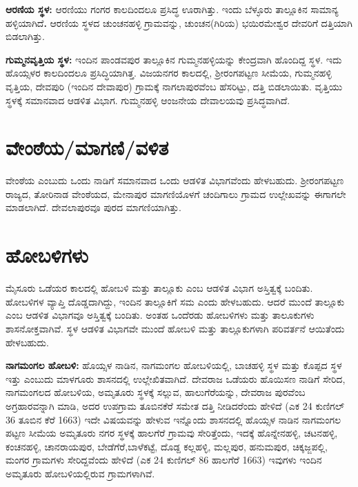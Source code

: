 \textbf{ಆರಣಿಯ ಸ್ಥಳ:} ಆರಣಿಯು ಗಂಗರ ಕಾಲದಿಂದಲೂ ಪ್ರಸಿದ್ಧ ಊರಾಗಿತ್ತು. ಇಂದು ಬೆಳ್ಳೂರು ತಾಲ್ಲೂಕಿನ ಸಾಮಾನ್ಯ ಹಳ್ಳಿಯಾಗಿದೆ\textbf{. }ಆರಣಿಯ ಸ್ಥಳದ ಚುಂಚನಹಳ್ಳಿ ಗ್ರಾಮವನ್ನು, ಚುಂಚನ(ಗಿರಿಯ) ಭಯಿರಮೇಶ್ವರ ದೇವರಿಗೆ ದತ್ತಿಯಾಗಿ ಬಿಡಲಾಗಿತ್ತು.

\textbf{ಗುಮ್ಮನವೃತ್ತಿಯ ಸ್ಥಳ:} ಇಂದಿನ ಪಾಂಡವಪುರ ತಾಲ್ಲೂಕಿನ ಗುಮ್ಮನಹಳ್ಳಿಯನ್ನು ಕೇಂದ್ರವಾಗಿ ಹೊಂದಿದ್ದ ಸ್ಥಳ. ಇದು ಹೊಯ್ಸಳರ ಕಾಲದಿಂದಲೂ ಪ್ರಸಿದ್ಧಿಯಾಗಿತ್ತ. ವಿಜಯನಗರ ಕಾಲದಲ್ಲಿ, ಶ‍್ರೀರಂಗಪಟ್ಟಣ ಸೀಮೆಯ, ಗುಮ್ಮನಹಳ್ಳಿ ವೃತ್ತಿಯ, ದೇವಪುರಿ (ಇಂದಿನ ದೇವಾಪುರ) ಗ್ರಾಮಕ್ಕೆ ನಾಗಲಾಪುರವೆಂಬ ಹೆಸರಿಟ್ಟು, ದತ್ತಿ ಬಿಡಲಾಯಿತು. ವೃತ್ತಿಯು ಸ್ಥಳಕ್ಕೆ ಸಮಾನವಾದ ಆಡಳಿತ ವಿಭಾಗ. ಗುಮ್ಮನಹಳ್ಳಿ ಆಂಜನೇಯ ದೇವಾಲಯವು ಪ್ರಸಿದ್ಧವಾಗಿದೆ.


\section{ವೇಂಠೆಯ/ಮಾಗಣಿ/ವಳಿತ}

ವೇಂಠೆಯ ಎಂಬುದು ಒಂದು ನಾಡಿಗೆ ಸಮಾನವಾದ ಒಂದು ಆಡಳಿತ ವಿಭಾಗವೆಂದು ಹೇಳಬಹುದು. ಶ‍್ರೀರಂಗಪಟ್ಟಣ ರಾಜ್ಯದ, ತೋರಿನಾಡ ವೇಂಠೆಯದ, ಮೇನಾಪುರ ಮಾಗಣಿಯೊಳಗೆ ಚಂದಿಗಾಲು ಗ್ರಾಮದ ಉಲ್ಲೇಖವನ್ನು ಈಗಾಗಲೇ ಮಾಡಲಾಗಿದೆ. ದೇವಲಾಪುರವೂ ಪುರದ ಮಾಗಣಿಯಾಗಿತ್ತು.


\section{ಹೋಬಳಿಗಳು}

ಮೈಸೂರು ಒಡೆಯರ ಕಾಲದಲ್ಲಿ ಹೋಬಳಿ ಮತ್ತು ತಾಲ್ಲೂಕು ಎಂಬ ಆಡಳಿತ ವಿಭಾಗ ಅಸ್ತಿತ್ವಕ್ಕೆ ಬಂದಿತು. ಹೋಬಳಿಗಳ ವ್ಯಾಪ್ತಿ ದೊಡ್ಡದಾಗಿದ್ದು, ಇಂದಿನ ತಾಲ್ಲೂಕಿಗೆ ಸಮ ಎಂದು ಹೇಳಬಹುದು. ಆದರೆ ಮುಂದೆ ತಾಲ್ಲೂಕು ಎಂಬ ಆಡಳಿತ ವಿಭಾಗವೂ ಅಸ್ತಿತ್ವಕ್ಕೆ ಬಂದಿತು. ಅಂತಹ ಒಂದೆರಡು ಹೋಬಳಿಗಳು ಮತ್ತು ತಾಲೂಕುಗಳು ಶಾಸನೋಕ್ತವಾಗಿವೆ. ಸ್ಥಳ ಆಡಳಿತ ವಿಭಾಗವೇ ಮುಂದೆ ಹೋಬಳಿ ಮತ್ತು ತಾಲ್ಲೂಕುಗಳಾಗಿ ಪರಿವರ್ತನೆ ಆಯಿತೆಂದು ಹೇಳಬಹುದು.

\textbf{ನಾಗಮಂಗಲ ಹೋಬಳಿ:} ಹೊಯ್ಸಳ ನಾಡಿನ, ನಾಗಮಂಗಲ ಹೋಬಳಿಯಲ್ಲಿ, ಬಾಚಹಳ್ಳಿ ಸ್ಥಳ ಮತ್ತು ಕೊಪ್ಪದ ಸ್ಥಳ ಇತ್ತು ಎಂಬುದು ಮಾಳಗೂರು ಶಾಸನದಲ್ಲಿ ಉಲ್ಲೇಖಿತವಾಗಿದೆ. ದೇವರಾಜ ಒಡೆಯರು ಹೊಯಿಸಣ ನಾಡಿಗೆ ಸೇರಿದ, ನಾಗಮಂಗಲದ ಹೋಬಳಿಯ, ಅಮೃತೂರು ಸ್ಥಳಕ್ಕೆ ಸಲ್ಲುವ, ಹಾಲುಗೆರೆಯನ್ನು, ದೇವರಾಜ ಪುರವೆಂಬ ಅಗ್ರಹಾರವನ್ನಾಗಿ ಮಾಡಿ, ಅದರ ಉಪಗ್ರಾಮ ತೂಬಿನಕೆರೆ ಸಮೇತ ದತ್ತಿ ನೀಡಿದರೆಂದು ಹೇಳಿದೆ (ಎಕ 24 ಕುಣಿಗಲ್ 36 ತೂಬಿನ ಕೆರೆ 1663) ಇದೇ ವಿಷಯವನ್ನು ಹೇಳುವ ಇನ್ನೊಂದು ಶಾಸನದಲ್ಲಿ ಹೊಯ್ಸಳ ನಾಡಿನ ನಾಗಮಂಗಲ ಪಟ್ಟಣ ಸೀಮೆಯ ಅಮೃತೂರು ನಗರ ಸ್ಥಳಕ್ಕೆ ಹಾಲಗೆರೆ ಗ್ರಾಮವು ಸೇರಿತ್ತೆಂದು, ಇದಕ್ಕೆ ಹೊನ್ನೇನಹಳ್ಳಿ, ಚಟನಹಳ್ಳಿ, ಕಂಚನಹಳ್ಳಿ, ಚಾನರಾಯಪುರ, ಬೇಡೆಗೆರೆ,\break ಬಾಳೆಕಟ್ಟೆ, ದೊಡ್ದ ಕಲ್ಲಹಳ್ಳಿ, ಮಲ್ಲಪುರ, ಹನುಮಪುರ, ಚಿಕ್ಕಜ್ಜಪಲ್ಲಿ, ಮಂಗರ ಗ್ರಾಮಗಳು ಸೇರಿದ್ದವೆಂದು ಹೇಳಿದೆ (ಎಕ 24 ಕುಣಿಗಲ್ 86 ಹಾಲಗೆರೆ 1663) ಇವುಗಳು ಇಂದಿನ ಅಮೃತೂರು ಹೋಬಳಿಯಲ್ಲಿರುವ ಗ್ರಾಮಗಳಾಗಿವೆ.

